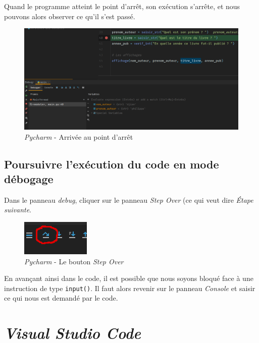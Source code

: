 \documentclass[a4paper,12pt]{book}
\begin{document}
Quand le programme atteint le point d'arrêt, son exécution s'arrête, et nous pouvons alors observer ce qu'il s'est passé.
\begin{figure}[h]
\begin{center}
\includegraphics[scale=0.3]{IMG/Pycharm-07.png}
\caption{\textit{Pycharm} - Arrivée au point d'arrêt}
\end{center}
\end{figure}
\medskip

\subsection*{Poursuivre l'exécution du code en mode débogage}
Dans le panneau \textit{debug}, cliquer sur le panneau \textit{Step Over} (ce qui veut dire \textit{Étape suivante}.
\begin{figure}[h]
\begin{center}
\includegraphics[scale=0.6]{IMG/Pycharm-08.png}
\caption{\textit{Pycharm} - Le bouton \textit{Step Over}}
\end{center}
\end{figure}
\medskip

En avançant ainsi dans le code, il est possible que nous soyons bloqué face à une instruction de type \texttt{input()}. Il faut alors revenir sur le panneau \textit{Console} et saisir ce qui nous est demandé par le code.
\medskip

\section{\textit{Visual Studio Code}}
\end{document}
